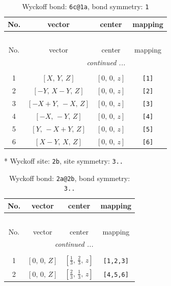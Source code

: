 \documentclass[fleqn,8pt]{jsarticle}
\begin{document}
\renewcommand{\arraystretch}{1.2}
\begin{longtable}{cccc}
\caption{Wyckoff bond: {\tt 6c@1a}, bond symmetry: {\tt 1}}
 \\
 \hline \hline
No. & vector & center & mapping \\ \hline \endfirsthead

\multicolumn{3}{l}{\tablename\ \thetable{}} \\
 \hline \hline
No. & vector & center & mapping \\ \hline \endhead

 \hline \hline
\multicolumn{3}{r}{\footnotesize\it continued ...} \\ \endfoot

 \hline \hline
\multicolumn{3}{r}{} \\ \endlastfoot

1 & $\left[ X,\, Y,\, Z \right]$ & $\left[ 0,\, 0,\, z \right]$ & {\tt [1]} \\ \hline
2 & $\left[ - Y,\, X - Y,\, Z \right]$ & $\left[ 0,\, 0,\, z \right]$ & {\tt [2]} \\ \hline
3 & $\left[ - X + Y,\, - X,\, Z \right]$ & $\left[ 0,\, 0,\, z \right]$ & {\tt [3]} \\ \hline
4 & $\left[ - X,\, - Y,\, Z \right]$ & $\left[ 0,\, 0,\, z \right]$ & {\tt [4]} \\ \hline
5 & $\left[ Y,\, - X + Y,\, Z \right]$ & $\left[ 0,\, 0,\, z \right]$ & {\tt [5]} \\ \hline
6 & $\left[ X - Y,\, X,\, Z \right]$ & $\left[ 0,\, 0,\, z \right]$ & {\tt [6]} \\
\end{longtable}
* Wyckoff site: {\tt 2b}, site symmetry: {\tt 3..}
\renewcommand{\arraystretch}{1.2}
\begin{longtable}{cccc}
\caption{Wyckoff bond: {\tt 2a@2b}, bond symmetry: {\tt 3..}}
 \\
 \hline \hline
No. & vector & center & mapping \\ \hline \endfirsthead

\multicolumn{3}{l}{\tablename\ \thetable{}} \\
 \hline \hline
No. & vector & center & mapping \\ \hline \endhead

 \hline \hline
\multicolumn{3}{r}{\footnotesize\it continued ...} \\ \endfoot

 \hline \hline
\multicolumn{3}{r}{} \\ \endlastfoot

1 & $\left[ 0,\, 0,\, Z \right]$ & $\left[ \frac{1}{3},\, \frac{2}{3},\, z \right]$ & {\tt [1,2,3]} \\ \hline
2 & $\left[ 0,\, 0,\, Z \right]$ & $\left[ \frac{2}{3},\, \frac{1}{3},\, z \right]$ & {\tt [4,5,6]} \\
\end{longtable}
\end{document}
